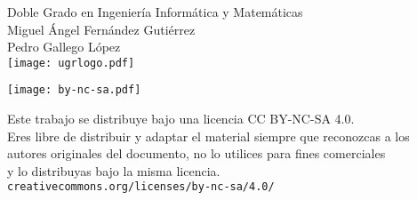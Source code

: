 \documentclass[10pt, a4paper]{article}
\theoremstyle{theorem-style}
\theoremstyle{theorem-style}
\theoremstyle{definition-style}
\theoremstyle{remark-style}
\theoremstyle{example-style}
\theoremstyle{definition-style}
\theoremstyle{remark-style}
\newcommand{\autor}{Miguel Ángel Fernández Gutiérrez\\Pedro Gallego López}
\newcommand{\grado}{Doble Grado en Ingeniería Informática y Matemáticas}
\begin{document}

\afterpage{\restorepagecolor} %
\begin{titlepage}

	\parbox[t]{\textwidth}{
			\raggedright %
			\fontsize{40pt}{40pt}\selectfont\sffamily{}
	}

	\vfill

	\parbox[t]{\textwidth}{
		\raggedright %
		\sffamily\large\color{white}
		\grado\\
		{\Large \autor }\\[15pt]
		\texttt{[image: ugrlogo.pdf]}
	}

\end{titlepage}


\thispagestyle{empty}
\null
\vfill

\parbox[t]{\textwidth}{
  \texttt{[image: by-nc-sa.pdf]}\\[4pt]
  \raggedright %
  \sffamily\large
  {\Large Este trabajo se distribuye bajo una licencia CC BY-NC-SA 4.0.}\\[4pt]
  Eres libre de distribuir y adaptar el material siempre que reconozcas a los\\
  autores originales del documento, no lo utilices para fines comerciales\\
  y lo distribuyas bajo la misma licencia.\\[4pt]
  \texttt{creativecommons.org/licenses/by-nc-sa/4.0/}
}

\end{document}
